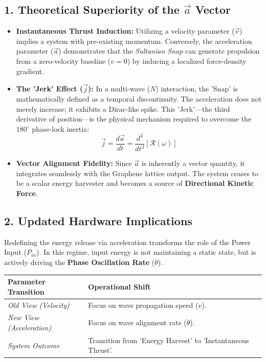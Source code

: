 \documentclass[11pt]{article}
\begin{document}
\subsection*{1. Theoretical Superiority of the $\vec{a}$ Vector}
\begin{itemize}
    \item \textbf{Instantaneous Thrust Induction:} Utilizing a velocity parameter ($\vec{v}$) implies a system with pre-existing momentum. Conversely, the acceleration parameter ($\vec{a}$) demonstrates that the \textit{Sultanian Snap} can generate propulsion from a zero-velocity baseline ($v=0$) by inducing a localized force-density gradient.
    
    \item \textbf{The 'Jerk' Effect ($\vec{j}$):} In a multi-wave ($N$) interaction, the 'Snap' is mathematically defined as a temporal discontinuity. The acceleration does not merely increase; it exhibits a Dirac-like spike. This 'Jerk'—the third derivative of position—is the physical mechanism required to overcome the $180^\circ$ phase-lock inertia:
    \begin{equation}
        \vec{j} = \frac{d\vec{a}}{dt} = \frac{d^3}{dt^3} \left[ \mathcal{R}(\omega) \right]
    \end{equation}
    
    \item \textbf{Vector Alignment Fidelity:} Since $\vec{a}$ is inherently a vector quantity, it integrates seamlessly with the Graphene lattice output. The system ceases to be a scalar energy harvester and becomes a source of \textbf{Directional Kinetic Force}.
\end{itemize}

\subsection*{2. Updated Hardware Implications}
Redefining the energy release via acceleration transforms the role of the Power Input ($P_{in}$). In this regime, input energy is not maintaining a static state, but is actively driving the \textbf{Phase Oscillation Rate} ($\ddot{\theta}$).

\begin{table}[h!]
\centering
\begin{tabular}{ll}
\toprule
\textbf{Parameter Transition} & \textbf{Operational Shift} \\ \midrule
\textit{Old View (Velocity)} & Focus on wave propagation speed ($v$). \\
\textit{New View (Acceleration)} & Focus on wave alignment rate ($\ddot{\theta}$). \\
\textit{System Outcome} & Transition from 'Energy Harvest' to 'Instantaneous Thrust'. \\ \bottomrule
\end{tabular}
\end{table}
\end{document}
